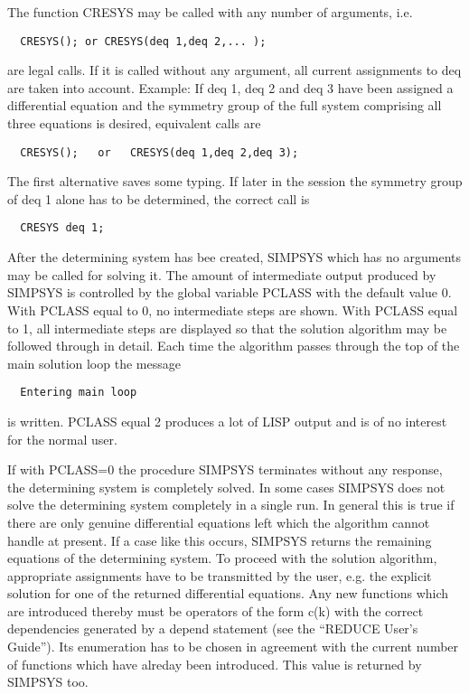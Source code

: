 The function CRESYS may be called with any number of arguments, i.e.

\begin{verbatim}
  CRESYS(); or CRESYS(deq 1,deq 2,... );
\end{verbatim}

 are legal calls. If it is called without any argument, all current
assignments to deq are taken into account. Example: If deq 1, deq 2
and deq 3 have been assigned a differential equation and the symmetry
group of the full system comprising all three equations is desired,
equivalent calls are

\begin{verbatim}
  CRESYS();   or   CRESYS(deq 1,deq 2,deq 3);
\end{verbatim}

The first alternative saves some typing. If later in the session the
symmetry group of deq 1 alone has to be determined, the correct call
is

\begin{verbatim}
  CRESYS deq 1;
\end{verbatim}

After the determining system has bee created, SIMPSYS which has no
arguments may be called for solving it. The amount of intermediate
output produced by SIMPSYS is controlled by the global variable PCLASS
with the default value 0.  With PCLASS equal to 0, no
intermediate steps are shown. With PCLASS equal to 1, all intermediate
steps are displayed so that the solution algorithm may be followed
 through in detail. Each time the algorithm
passes through the top of the main solution loop the message

\begin{verbatim}
  Entering main loop
\end{verbatim}

is written. PCLASS equal 2 produces a lot of LISP output and is of no
interest for the normal user.

If with PCLASS=0 the procedure SIMPSYS terminates without any
response, the determining system is completely solved.  In some cases
SIMPSYS does not solve the determining system completely in a single
run. In general this is true if there are only genuine differential
equations left which the algorithm cannot handle at present. If a case
like this occurs, SIMPSYS returns the remaining equations of the
determining system. To proceed with the solution algorithm,
appropriate assignments have to be transmitted by the user, e.g. the
explicit solution for one of the returned differential equations. Any
new functions which are introduced thereby must be operators of the
form c(k) with the correct dependencies generated by a depend
statement (see the ``REDUCE User's Guide''). Its enumeration has to be
chosen in agreement with the current number of functions which have
alreday been introduced.  This value is returned by SIMPSYS too.


